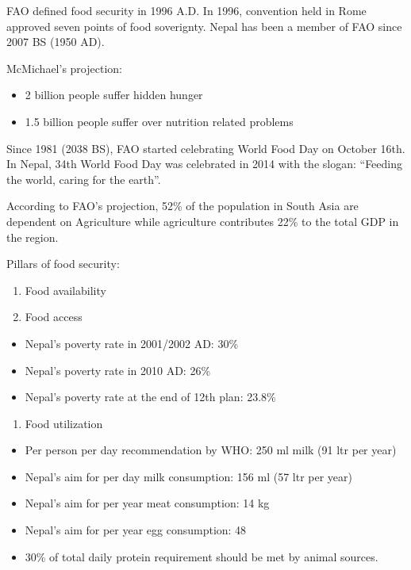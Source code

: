 \documentclass[
  openany]{book}
\providecommand{\tightlist}{%
  \setlength{\itemsep}{0pt}\setlength{\parskip}{0pt}}
\begin{document}
FAO defined food security in 1996 A.D. In 1996, convention held in Rome approved seven points of food soverignty. Nepal has been a member of FAO since 2007 BS (1950 AD).

McMichael's projection:

\begin{itemize}
\tightlist
\item
  2 billion people suffer hidden hunger
\item
  1.5 billion people suffer over nutrition related problems
\end{itemize}

Since 1981 (2038 BS), FAO started celebrating World Food Day on October 16th. In Nepal, 34th World Food Day was celebrated in 2014 with the slogan: ``Feeding the world, caring for the earth''.

According to FAO's projection, 52\% of the population in South Asia are dependent on Agriculture while agriculture contributes 22\% to the total GDP in the region.

Pillars of food security:

\begin{enumerate}
\def\labelenumi{\arabic{enumi}.}
\tightlist
\item
  Food availability
\item
  Food access
\end{enumerate}

\begin{itemize}
\tightlist
\item
  Nepal's poverty rate in 2001/2002 AD: 30\%
\item
  Nepal's poverty rate in 2010 AD: 26\%
\item
  Nepal's poverty rate at the end of 12th plan: 23.8\%
\end{itemize}

\begin{enumerate}
\def\labelenumi{\arabic{enumi}.}
\setcounter{enumi}{2}
\tightlist
\item
  Food utilization
\end{enumerate}

\begin{itemize}
\tightlist
\item
  Per person per day recommendation by WHO: 250 ml milk (91 ltr per year)
\item
  Nepal's aim for per day milk consumption: 156 ml (57 ltr per year)
\item
  Nepal's aim for per year meat consumption: 14 kg
\item
  Nepal's aim for per year egg consumption: 48
\item
  30\% of total daily protein requirement should be met by animal sources.
\end{itemize}
\end{document}
